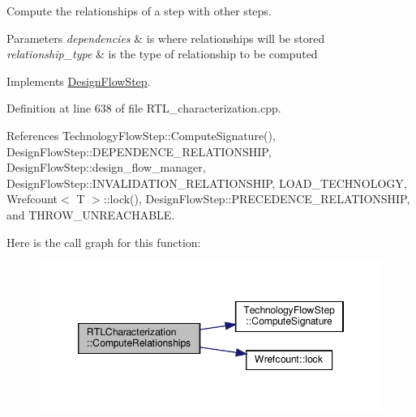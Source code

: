 Compute the relationships of a step with other steps. 


\begin{DoxyParams}{Parameters}
{\em dependencies} & is where relationships will be stored \\
\hline
{\em relationship\+\_\+type} & is the type of relationship to be computed \\
\hline
\end{DoxyParams}


Implements \hyperlink{classDesignFlowStep_a65bf7bcb603189a7ddcf930c3a9fd7fe}{Design\+Flow\+Step}.



Definition at line 638 of file R\+T\+L\+\_\+characterization.\+cpp.



References Technology\+Flow\+Step\+::\+Compute\+Signature(), Design\+Flow\+Step\+::\+D\+E\+P\+E\+N\+D\+E\+N\+C\+E\+\_\+\+R\+E\+L\+A\+T\+I\+O\+N\+S\+H\+IP, Design\+Flow\+Step\+::design\+\_\+flow\+\_\+manager, Design\+Flow\+Step\+::\+I\+N\+V\+A\+L\+I\+D\+A\+T\+I\+O\+N\+\_\+\+R\+E\+L\+A\+T\+I\+O\+N\+S\+H\+IP, L\+O\+A\+D\+\_\+\+T\+E\+C\+H\+N\+O\+L\+O\+GY, Wrefcount$<$ T $>$\+::lock(), Design\+Flow\+Step\+::\+P\+R\+E\+C\+E\+D\+E\+N\+C\+E\+\_\+\+R\+E\+L\+A\+T\+I\+O\+N\+S\+H\+IP, and T\+H\+R\+O\+W\+\_\+\+U\+N\+R\+E\+A\+C\+H\+A\+B\+LE.

Here is the call graph for this function\+:
\nopagebreak
\begin{figure}[H]
\begin{center}
\leavevmode
\includegraphics[width=346pt]{d9/d84/classRTLCharacterization_acb29748095419798f3ff059e7b00099f_cgraph}
\end{center}
\end{figure}
\mbox{\label{classRTLCharacterization_a6550aa6ae4bcf74abe7cb170f82d5905}} 
